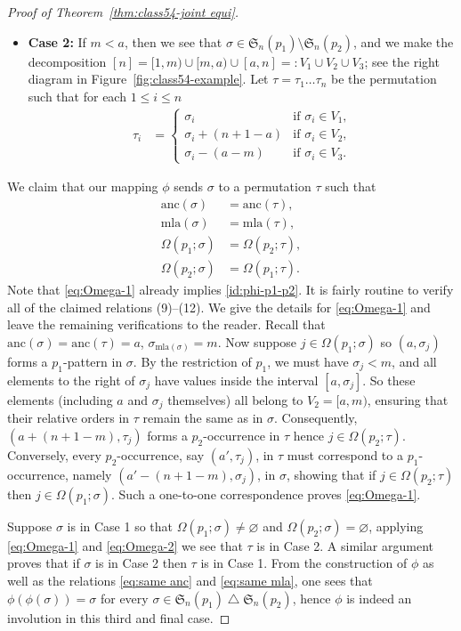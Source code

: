 \documentclass[12pt]{article}
\def\fS{\mathfrak{S}}
\def\anc{\mathrm{anc}}
\def\mla{\mathrm{mla}}
\begin{document}
\begin{proof}[Proof of Theorem~\ref{thm:class54-joint equi}]
\begin{itemize}
    \item \textbf{Case 2:} If $m < a$, then we see that $\sigma\in\fS_n(p_1)\setminus\fS_n(p_2)$, and we make the decomposition $[n]=[1,m)\cup[m,a)\cup[a,n]=:V_1\cup V_2\cup V_3$; see the right diagram in Figure~\ref{fig:class54-example}. Let $\tau=\tau_1\ldots \tau_n$ be the permutation such that for each $1\le i\le n$
    \begin{align*}
    \tau_i &=\begin{cases}
    \sigma_i & \text{if $\sigma_i\in V_1$,}\\
    \sigma_i+(n+1-a) & \text{if $\sigma_i\in V_2$,}\\
    \sigma_i-(a-m) & \text{if $\sigma_i\in V_3$.}
    \end{cases}
    \end{align*}
\end{itemize}

We claim that our mapping $\phi$ sends $\sigma$ to a permutation $\tau$ such that
\begin{align}
  \anc(\sigma) &= \anc(\tau),\label{eq:same anc}\\
  \mla(\sigma) &= \mla(\tau),\label{eq:same mla}\\
  \Omega(p_1;\sigma) &= \Omega(p_2;\tau),\label{eq:Omega-1}\\
  \Omega(p_2;\sigma) &= \Omega(p_1;\tau).\label{eq:Omega-2}
\end{align}
Note that \eqref{eq:Omega-1} already implies \eqref{id:phi-p1-p2}. It is fairly routine to verify all of the claimed relations (9)--(12). We give the details for \eqref{eq:Omega-1} and leave the remaining verifications to the reader. Recall that $\anc(\sigma)=\anc(\tau)=a$, $\sigma_{\mla(\sigma)}=m$. Now suppose $j\in\Omega(p_1;\sigma)$ so $(a,\sigma_j)$ forms a $p_1$-pattern in $\sigma$. By the restriction of $p_1$, we must have $\sigma_j<m$, and all elements to the right of $\sigma_j$ have values inside the interval $[a,\sigma_j]$. So these elements (including $a$ and $\sigma_j$ themselves) all belong to $V_2=[a,m)$, ensuring that their relative orders in $\tau$ remain the same as in $\sigma$. Consequently, $(a+(n+1-m),\tau_j)$ forms a $p_2$-occurrence in $\tau$ hence $j\in\Omega(p_2;\tau)$. Conversely, every $p_2$-occurrence, say $(a',\tau_j)$, in $\tau$ must correspond to a $p_1$-occurrence, namely $(a'-(n+1-m),\sigma_j)$, in $\sigma$, showing that if $j\in\Omega(p_2;\tau)$ then $j\in\Omega(p_1;\sigma)$. Such a one-to-one correspondence proves \eqref{eq:Omega-1}.

Suppose $\sigma$ is in Case 1 so that $\Omega(p_1;\sigma)\neq\varnothing$ and $\Omega(p_2;\sigma)=\varnothing$, applying \eqref{eq:Omega-1} and \eqref{eq:Omega-2} we see that $\tau$ is in Case 2. A similar argument proves that if $\sigma$ is in Case 2 then $\tau$ is in Case 1. From the construction of $\phi$ as well as the relations \eqref{eq:same anc} and \eqref{eq:same mla}, one sees that $\phi(\phi(\sigma))=\sigma$ for every $\sigma\in \fS_n(p_1) \mathbin{\triangle} \fS_n(p_2)$, hence $\phi$ is indeed an involution in this third and final case.
\end{proof}
\end{document}
